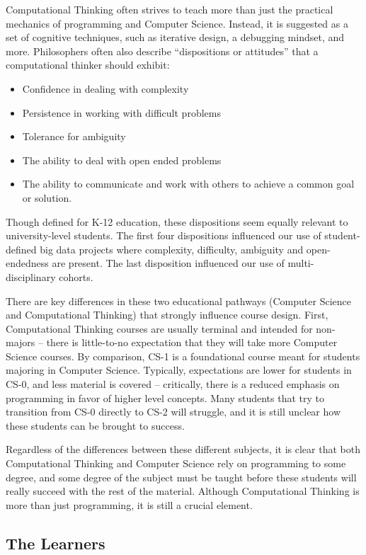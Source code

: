 Computational Thinking often strives to teach more than just the practical mechanics of programming and Computer Science.
Instead, it is suggested as a set of cognitive techniques, such as iterative design, a debugging mindset, and more.
Philosophers often also describe ``dispositions or attitudes'' that a computational thinker should exhibit\cite{csta-computational-thinking}:
\begin{itemize}
\item Confidence in dealing with complexity
\item Persistence in working with difficult problems
\item Tolerance for ambiguity
\item The ability to deal with open ended problems
\item The ability to communicate and work with others to achieve a common goal or solution.
\end{itemize}
Though defined for K-12 education, these dispositions seem equally relevant to university-level students. The first four dispositions influenced our use of student-defined big data projects where complexity, difficulty, ambiguity and open-endedness are present. The last disposition influenced our use of multi-disciplinary cohorts.

There are key differences in these two educational pathways (Computer Science and Computational Thinking) that strongly influence course design.
First, Computational Thinking courses are usually terminal and intended for non-majors -- there is little-to-no expectation that they will take more Computer Science courses.
By comparison, CS-1 is a foundational course meant for students majoring in Computer Science.
Typically, expectations are lower for students in CS-0, and less material is covered -- critically, there is a reduced emphasis on programming in favor of higher level concepts.
Many students that try to transition from CS-0 directly to CS-2 will struggle, and it is still unclear how these students can be brought to success.

Regardless of the differences between these different subjects, it is clear that both Computational Thinking and Computer Science rely on programming to some degree, and some degree of the subject must be taught before these students will really succeed with the rest of the material.
Although Computational Thinking is more than just programming, it is still a crucial element.

\subsection{The Learners}

